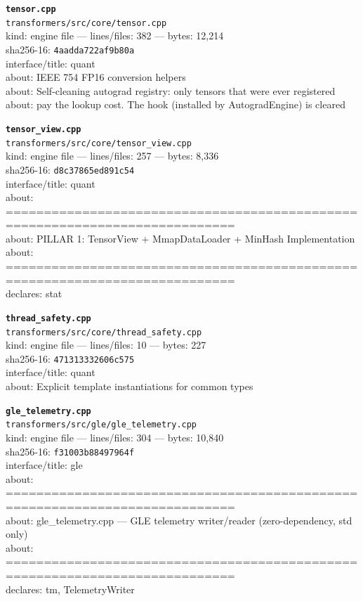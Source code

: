 \noindent\textbf{\texttt{tensor.cpp}}\\
\texttt{transformers/src/core/tensor.cpp}\\
kind: engine file --- lines/files: 382 --- bytes: 12,214\\
sha256-16: \texttt{4aadda722af9b80a}\\
interface/title: quant\\
about: IEEE 754 FP16 conversion helpers\\
about: Self-cleaning autograd registry: only tensors that were ever registered\\
about: pay the lookup cost. The hook (installed by AutogradEngine) is cleared\\
\vspace*{6.0pt}

\noindent\textbf{\texttt{tensor\_view.cpp}}\\
\texttt{transformers/src/core/tensor\_view.cpp}\\
kind: engine file --- lines/files: 257 --- bytes: 8,336\\
sha256-16: \texttt{d8c37865ed891c54}\\
interface/title: quant\\
about: ============================================================================\\
about: PILLAR 1: TensorView + MmapDataLoader + MinHash Implementation\\
about: ============================================================================\\
declares: stat\\
\vspace*{6.0pt}

\noindent\textbf{\texttt{thread\_safety.cpp}}\\
\texttt{transformers/src/core/thread\_safety.cpp}\\
kind: engine file --- lines/files: 10 --- bytes: 227\\
sha256-16: \texttt{471313332606c575}\\
interface/title: quant\\
about: Explicit template instantiations for common types\\
\vspace*{6.0pt}
\newpage

\noindent\textbf{\texttt{gle\_telemetry.cpp}}\\
\texttt{transformers/src/gle/gle\_telemetry.cpp}\\
kind: engine file --- lines/files: 304 --- bytes: 10,840\\
sha256-16: \texttt{f31003b88497964f}\\
interface/title: gle\\
about: ============================================================================\\
about: gle\_telemetry.cpp — GLE telemetry writer/reader (zero-dependency, std only)\\
about: ============================================================================\\
declares: tm, TelemetryWriter\\
\vspace*{6.0pt}

